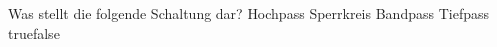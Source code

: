     {Was stellt die folgende Schaltung dar? }
    {Hochpass}
    {Sperrkreis}
    {Bandpass}
    {Tiefpass}
    {true}{false}